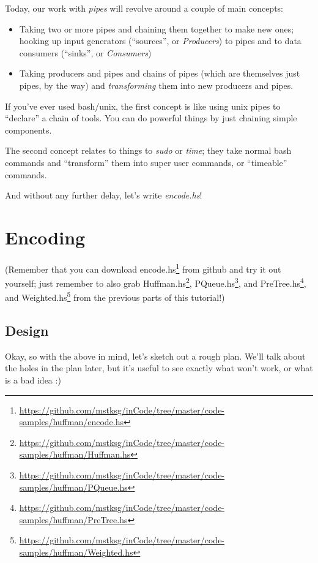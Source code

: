 \documentclass[]{article}
\renewcommand{\href}[2]{#2\footnote{\url{#1}}}
\begin{document}
Today, our work with \emph{pipes} will revolve around a couple of main
concepts:

\begin{itemize}
\item
  Taking two or more pipes and chaining them together to make new ones;
  hooking up input generators (``sources'', or \emph{Producers}) to
  pipes and to data consumers (``sinks'', or \emph{Consumers})
\item
  Taking producers and pipes and chains of pipes (which are themselves
  just pipes, by the way) and \emph{transforming} them into new
  producers and pipes.
\end{itemize}

If you've ever used bash/unix, the first concept is like using unix
pipes to ``declare'' a chain of tools. You can do powerful things by
just chaining simple components.

The second concept relates to things to \emph{sudo} or \emph{time}; they
take normal bash commands and ``transform'' them into super user
commands, or ``timeable'' commands.

And without any further delay, let's write \emph{encode.hs}!

\section{Encoding}\label{encoding}

(Remember that you can download
\href{https://github.com/mstksg/inCode/tree/master/code-samples/huffman/encode.hs}{encode.hs}
from github and try it out yourself; just remember to also grab
\href{https://github.com/mstksg/inCode/tree/master/code-samples/huffman/Huffman.hs}{Huffman.hs},
\href{https://github.com/mstksg/inCode/tree/master/code-samples/huffman/PQueue.hs}{PQueue.hs},
and
\href{https://github.com/mstksg/inCode/tree/master/code-samples/huffman/PreTree.hs}{PreTree.hs},
and
\href{https://github.com/mstksg/inCode/tree/master/code-samples/huffman/Weighted.hs}{Weighted.hs}
from the previous parts of this tutorial!)

\subsection{Design}\label{design}

Okay, so with the above in mind, let's sketch out a rough plan. We'll
talk about the holes in the plan later, but it's useful to see exactly
what won't work, or what is a bad idea :)
\end{document}
